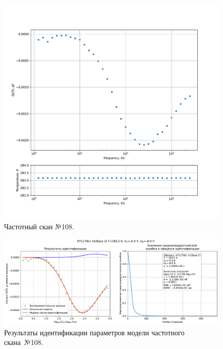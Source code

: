 \begin{figure}[!ht]
    \centering
    \includegraphics[width=1\textwidth]{../plots/КТ117№1_п1(база 2)_2500Гц-1Гц_1пФ_+10С_-6В-8В_50мВ_20мкс_шаг_0,1.pdf}
    \caption{Частотный скан №108.}
    \label{pic:frequency_scan_108}
\end{figure}

\begin{figure}[!ht]
    \centering
    \includegraphics[width=1\textwidth]{../plots/КТ117№1_п1(база 2)_2500Гц-1Гц_1пФ_+10С_-6В-8В_50мВ_20мкс_шаг_0,1_model.pdf}
    \caption{Результаты идентификации параметров модели частотного скана~№108.}
    \label{pic:frequency_scan_model108}
\end{figure}

\pagebreak



